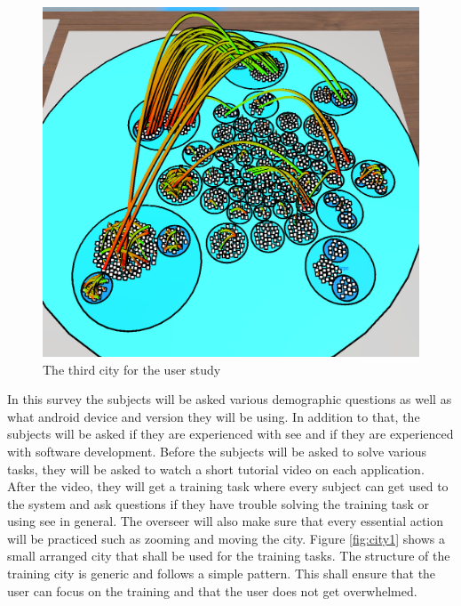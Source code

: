 \begin{figure}[htb]
  \centering
  \includegraphics[width=1\textwidth]{Evaluation/img/city_3.png}
  \caption{The third \gls{city} for the user study}\label{fig:city3}
\end{figure}
In this survey the subjects will be asked various demographic questions as well as what \gls{android} device and version they will be using.
In addition to that, the subjects will be asked if they are experienced with \gls{see} and if they are experienced with software development.
Before the subjects will be asked to solve various tasks, they will be asked to watch a short tutorial video on each application.
After the video, they will get a training task where every subject can get used to the system and ask questions if they have trouble solving the training task or using \gls{see} in general.
The overseer will also make sure that every essential action will be practiced such as zooming and moving the \gls{city}.
Figure \ref{fig:city1} shows a small arranged \gls{city} that shall be used for the training tasks.
The structure of the training \gls{city} is generic and follows a simple pattern.
This shall ensure that the user can focus on the training and that the user does not get overwhelmed.

